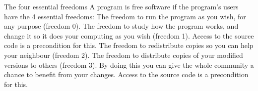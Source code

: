 \documentclass{article}
\begin{document}
 
\hspace{2.5cm} The four essential freedoms 
\vspace{0.6cm} A program is free software if the program's users have the 4 essential freedoms: The freedom to run the program as you wish, for any purpose (freedom 0).\vspace{0.2cm} The freedom to study how the program works, and change it so it does your computing as you wish (freedom 1). Access to the source code is a precondition for this.
\vspace{0.2cm} The freedom to redistribute copies so you can help your neighbour (freedom 2).
\vspace{0.2cm} The freedom to distribute copies of your modified versions to others (freedom 3). By doing this you can give the whole community a chance to benefit from your changes. Access to the source code is a precondition for this. 
\end{document}
